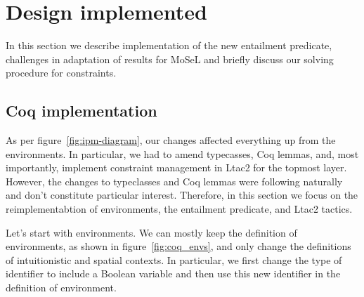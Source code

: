 \begin{itemize}


\end{itemize}

\section{Design implemented}

In this section we describe implementation of the new entailment predicate, challenges in adaptation of \citet{harlandResourceDistributionBooleanConstraints2003} results for MoSeL and briefly discuss our solving procedure for constraints.

\subsection{Coq implementation}
\label{subsec:ipm_constr_coq_implementation}

As per figure~\ref{fig:ipm-diagram}, our changes affected everything up from the environments.
In particular, we had to amend typecasses, Coq lemmas, and, most importantly, implement constraint management in Ltac2 for the topmost layer.
However, the changes to typeclasses and Coq lemmas were following naturally and don't constitute particular interest.
Therefore, in this section we focus on the reimplementabtion of environments, the entailment predicate, and Ltac2 tactics.

Let's start with environments.
We can mostly keep the definition of environments, as shown in figure~\ref{fig:coq_envs}, and only change the definitions of intuitionistic and spatial contexts.
In particular, we first change the type of identifier to include a Boolean variable and then use this new identifier in the definition of environment.

